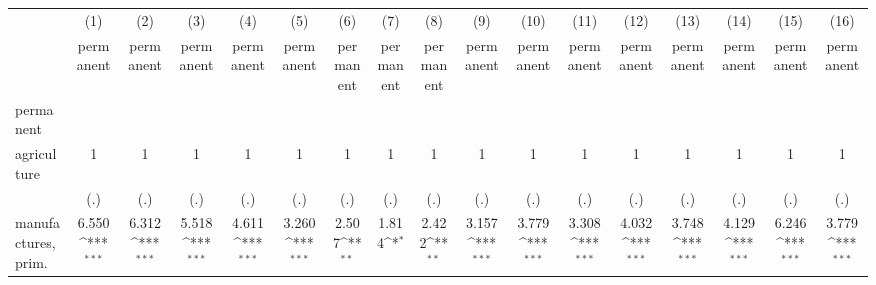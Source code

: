 {
\def\sym#1{\ifmmode^{#1}\else\(^{#1}\)\fi}
\begin{tabular}{l*{16}{c}}
\hline\hline
                    &\multicolumn{1}{c}{(1)}&\multicolumn{1}{c}{(2)}&\multicolumn{1}{c}{(3)}&\multicolumn{1}{c}{(4)}&\multicolumn{1}{c}{(5)}&\multicolumn{1}{c}{(6)}&\multicolumn{1}{c}{(7)}&\multicolumn{1}{c}{(8)}&\multicolumn{1}{c}{(9)}&\multicolumn{1}{c}{(10)}&\multicolumn{1}{c}{(11)}&\multicolumn{1}{c}{(12)}&\multicolumn{1}{c}{(13)}&\multicolumn{1}{c}{(14)}&\multicolumn{1}{c}{(15)}&\multicolumn{1}{c}{(16)}\\
                    &\multicolumn{1}{c}{permanent}&\multicolumn{1}{c}{permanent}&\multicolumn{1}{c}{permanent}&\multicolumn{1}{c}{permanent}&\multicolumn{1}{c}{permanent}&\multicolumn{1}{c}{permanent}&\multicolumn{1}{c}{permanent}&\multicolumn{1}{c}{permanent}&\multicolumn{1}{c}{permanent}&\multicolumn{1}{c}{permanent}&\multicolumn{1}{c}{permanent}&\multicolumn{1}{c}{permanent}&\multicolumn{1}{c}{permanent}&\multicolumn{1}{c}{permanent}&\multicolumn{1}{c}{permanent}&\multicolumn{1}{c}{permanent}\\
\hline
permanent           &                     &                     &                     &                     &                     &                     &                     &                     &                     &                     &                     &                     &                     &                     &                     &                     \\
agriculture         &           1         &           1         &           1         &           1         &           1         &           1         &           1         &           1         &           1         &           1         &           1         &           1         &           1         &           1         &           1         &           1         \\
                    &         (.)         &         (.)         &         (.)         &         (.)         &         (.)         &         (.)         &         (.)         &         (.)         &         (.)         &         (.)         &         (.)         &         (.)         &         (.)         &         (.)         &         (.)         &         (.)         \\
[1em]
manufactures, prim. &       6.550\sym{***}&       6.312\sym{***}&       5.518\sym{***}&       4.611\sym{***}&       3.260\sym{***}&       2.507\sym{**} &       1.814\sym{*}  &       2.422\sym{**} &       3.157\sym{***}&       3.779\sym{***}&       3.308\sym{***}&       4.032\sym{***}&       3.748\sym{***}&       4.129\sym{***}&       6.246\sym{***}&       3.779\sym{***}\\

\end{tabular}}
